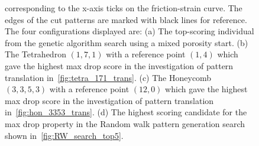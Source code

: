 \begin{figure}[!htb]
{  corresponding to the x-axis ticks on the friction-strain curve. The edges of the cut patterns are marked with black lines for reference. The four
  configurations displayed are: (a) The top-scoring individual from the genetic
  algorithm search using a mixed porosity start. (b) The Tetrahedron $(1,7,1)$
  with a reference point $(1,4)$ which gave the highest max drop score in the
  investigation of pattern translation in~\cref{fig:tetra_171_trans}. (c) The
  Honeycomb $(3,3,5,3)$ with a reference point $(12,0)$ which gave the highest
  max drop score in the investigation of pattern translation
  in~\cref{fig:hon_3353_trans}. (d) The highest scoring candidate for the max drop property in the Random walk pattern generation search shown in~\cref{fig:RW_search_top5}. }
  \label{fig:grad_cam}
\end{figure}


